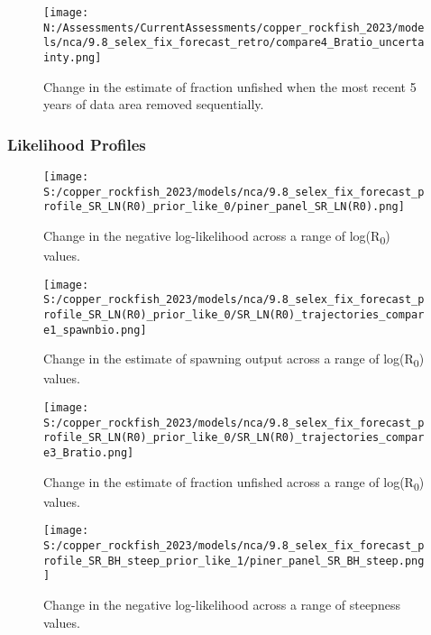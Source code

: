 \documentclass[11pt,
  english,
  letterpaper,
]{article}
\begin{document}
\pagebreak

\begin{figure}
\centering
\texttt{[image: N:/Assessments/CurrentAssessments/copper\_rockfish\_2023/models/nca/9.8\_selex\_fix\_forecast\_retro/compare4\_Bratio\_uncertainty.png]}
\caption{Change in the estimate of fraction unfished when the most recent 5 years of data area removed sequentially.\label{fig:retro-depl}}
\end{figure}

\pagebreak

\hypertarget{likelihood-profiles}{%
\subsubsection{Likelihood Profiles}\label{likelihood-profiles}}

\begin{figure}
\centering
\texttt{[image: S:/copper\_rockfish\_2023/models/nca/9.8\_selex\_fix\_forecast\_profile\_SR\_LN(R0)\_prior\_like\_0/piner\_panel\_SR\_LN(R0).png]}
\caption{Change in the negative log-likelihood across a range of log(R\textsubscript{0}) values.\label{fig:r0-profile}}
\end{figure}

\pagebreak

\begin{figure}
\centering
\texttt{[image: S:/copper\_rockfish\_2023/models/nca/9.8\_selex\_fix\_forecast\_profile\_SR\_LN(R0)\_prior\_like\_0/SR\_LN(R0)\_trajectories\_compare1\_spawnbio.png]}
\caption{Change in the estimate of spawning output across a range of log(R\textsubscript{0}) values.\label{fig:r0-ssb}}
\end{figure}

\pagebreak

\begin{figure}
\centering
\texttt{[image: S:/copper\_rockfish\_2023/models/nca/9.8\_selex\_fix\_forecast\_profile\_SR\_LN(R0)\_prior\_like\_0/SR\_LN(R0)\_trajectories\_compare3\_Bratio.png]}
\caption{Change in the estimate of fraction unfished across a range of log(R\textsubscript{0}) values.\label{fig:r0-depl}}
\end{figure}

\pagebreak

\begin{figure}
\centering
\texttt{[image: S:/copper\_rockfish\_2023/models/nca/9.8\_selex\_fix\_forecast\_profile\_SR\_BH\_steep\_prior\_like\_1/piner\_panel\_SR\_BH\_steep.png]}
\caption{Change in the negative log-likelihood across a range of steepness values.\label{fig:h-profile}}
\end{figure}
\end{document}
